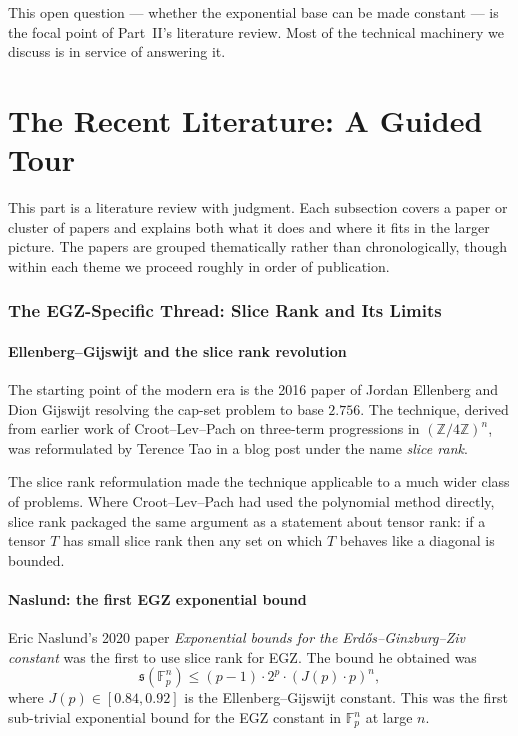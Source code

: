 \documentclass[11pt,a4paper]{article}
\theoremstyle{plain}
\theoremstyle{definition}
\theoremstyle{remark}
\newcommand{\F}{\mathbb{F}}
\newcommand{\Z}{\mathbb{Z}}
\newcommand{\sUFp}{\mathfrak{s}}
\newcommand{\EGZ}{\textsf{EGZ}}
\begin{document}
This open question --- whether the exponential base can be made constant --- is the focal point of Part~II's literature review. Most of the technical machinery we discuss is in service of answering it.

\newpage

\part{The Recent Literature: A Guided Tour}

This part is a literature review with judgment. Each subsection covers a paper or cluster of papers and explains both what it does and where it fits in the larger picture. The papers are grouped thematically rather than chronologically, though within each theme we proceed roughly in order of publication.


\section{The EGZ-Specific Thread: Slice Rank and Its Limits}

\subsection{Ellenberg--Gijswijt and the slice rank revolution}

The starting point of the modern era is the 2016 paper of Jordan Ellenberg and Dion Gijswijt resolving the cap-set problem to base $2.756$. The technique, derived from earlier work of Croot--Lev--Pach on three-term progressions in $(\Z/4\Z)^n$, was reformulated by Terence Tao in a blog post under the name \emph{slice rank}.

The slice rank reformulation made the technique applicable to a much wider class of problems. Where Croot--Lev--Pach had used the polynomial method directly, slice rank packaged the same argument as a statement about tensor rank: if a tensor $T$ has small slice rank then any set on which $T$ behaves like a diagonal is bounded.

\subsection{Naslund: the first EGZ exponential bound}

Eric Naslund's 2020 paper \emph{Exponential bounds for the Erd\H{o}s--Ginzburg--Ziv constant} \cite{naslund2020} was the first to use slice rank for \EGZ. The bound he obtained was
\begin{equation}
\sUFp(\F_p^n) \leq (p-1) \cdot 2^p \cdot (J(p) \cdot p)^n,
\end{equation}
where $J(p) \in [0.84, 0.92]$ is the Ellenberg--Gijswijt constant. This was the first sub-trivial exponential bound for the EGZ constant in $\F_p^n$ at large $n$.
\end{document}
